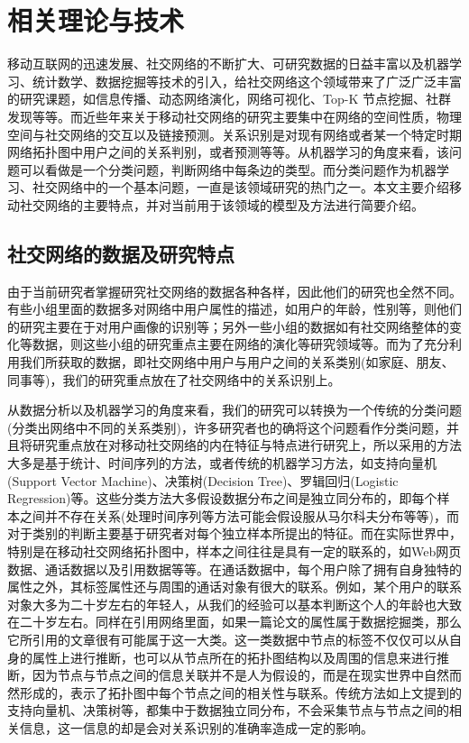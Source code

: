 \chapter{相关理论与技术}
移动互联网的迅速发展、社交网络的不断扩大、可研究数据的日益丰富以及机器学习、统计数学、数据挖掘等技术的引入，给社交网络这个领域带来了广泛广泛丰富的研究课题，如信息传播、动态网络演化，网络可视化、Top-K 节点挖掘、社群发现等等。而近些年来关于移动社交网络的研究主要集中在网络的空间性质，物理空间与社交网络的交互以及链接预测。关系识别是对现有网络或者某一个特定时期网络拓扑图中用户之间的关系判别，或者预测等等。从机器学习的角度来看，该问题可以看做是一个分类问题，判断网络中每条边的类型。而分类问题作为机器学习、社交网络中的一个基本问题，一直是该领域研究的热门之一。本文主要介绍移动社交网络的主要特点，并对当前用于该领域的模型及方法进行简要介绍。

\section{社交网络的数据及研究特点}

由于当前研究者掌握研究社交网络的数据各种各样，因此他们的研究也全然不同。有些小组里面的数据多对网络中用户属性的描述，如用户的年龄，性别等，则他们的研究主要在于对用户画像的识别等；另外一些小组的数据如有社交网络整体的变化等数据，则这些小组的研究重点主要在网络的演化等研究领域等。而为了充分利用我们所获取的数据，即社交网络中用户与用户之间的关系类别(如家庭、朋友、同事等)，我们的研究重点放在了社交网络中的关系识别上。

从数据分析以及机器学习的角度来看，我们的研究可以转换为一个传统的分类问题(分类出网络中不同的关系类别)，许多研究者也的确将这个问题看作分类问题，并且将研究重点放在对移动社交网络的内在特征与特点进行研究上，所以采用的方法大多是基于统计、时间序列的方法，或者传统的机器学习方法，如支持向量机(Support Vector Machine)、决策树(Decision Tree)、罗辑回归(Logistic Regression)等。这些分类方法大多假设数据分布之间是独立同分布的，即每个样本之间并不存在关系(处理时间序列等方法可能会假设服从马尔科夫分布等等)，而对于类别的判断主要基于研究者对每个独立样本所提出的特征。而在实际世界中，特别是在移动社交网络拓扑图中，样本之间往往是具有一定的联系的，如Web网页数据、通话数据以及引用数据等等。在通话数据中，每个用户除了拥有自身独特的属性之外，其标签属性还与周围的通话对象有很大的联系。例如，某个用户的联系对象大多为二十岁左右的年轻人，从我们的经验可以基本判断这个人的年龄也大致在二十岁左右。同样在引用网络里面，如果一篇论文的属性属于数据挖掘类，那么它所引用的文章很有可能属于这一大类。这一类数据中节点的标签不仅仅可以从自身的属性上进行推断，也可以从节点所在的拓扑图结构以及周围的信息来进行推断，因为节点与节点之间的信息关联并不是人为假设的，而是在现实世界中自然而然形成的，表示了拓扑图中每个节点之间的相关性与联系。传统方法如上文提到的支持向量机、决策树等，都集中于数据独立同分布，不会采集节点与节点之间的相关信息，这一信息的却是会对关系识别的准确率造成一定的影响。

